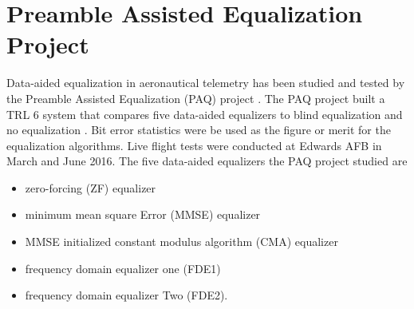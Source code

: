 

\chapter{Preamble Assisted Equalization Project}
Data-aided equalization in aeronautical telemetry has been studied and tested by the Preamble Assisted Equalization (PAQ) project \cite{paq-phase1-report:2014}.
The PAQ project built a TRL 6 system that compares five data-aided equalizers to blind equalization and no equalization \cite{frerkingjpl}.
Bit error statistics were be used as the figure or merit for the equalization algorithms.
Live flight tests were conducted at Edwards AFB in March and June 2016.
The five data-aided equalizers the PAQ project studied are
\begin{itemize}
\item zero-forcing (ZF) equalizer
\item minimum mean square Error (MMSE) equalizer
\item MMSE initialized constant modulus algorithm (CMA) equalizer
\item frequency domain equalizer one (FDE1)
\item frequency domain equalizer Two (FDE2).
\end{itemize}
